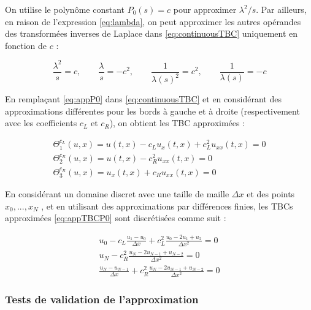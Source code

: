 \indent On utilise le polynôme constant $P_0(s) = c$  pour approximer $\lambda^2/s$. Par ailleurs, en raison de l'expression \eqref{eq:lambda}, on peut approximer les autres opérandes des transformées inverses de Laplace dans \eqref{eq:continuousTBC} uniquement en fonction de $c$ :

\begin{equation}
	\label{eq:appP0}
	\frac{\lambda^2}{s}  = c, \qquad
	\frac{\lambda}{s}  = -c^2, \qquad
	\frac{1}{\lambda(s)^2}  = c^2,\qquad 
	 \frac{1}{\lambda(s)}  = -c 
\end{equation}

\indent En remplaçant \eqref{eq:appP0}  dans \eqref{eq:continuousTBC} et en considérant des approximations différentes pour les bords à gauche et à droite (respectivement avec les coefficients $c_L$ et $c_R$), on obtient les TBC approximées :

\begin{equation}
\label{eq:appTBCP0}
    \begin{gathered}
        \Theta_1^{c_L}(u,x) = u(t,x) - c_L u_x(t,x)  + c_L^2  u_{xx}(t,x) = 0 \\
        \Theta_2^{c_R}(u,x) = u(t,x) - c_R^2  u_{xx}(t,x) = 0 \\
        \Theta_3^{c_R}(u,x) = u_x(t,x) + c_R u_{xx}(t,x)= 0 
    \end{gathered}
\end{equation}

\indent En considérant un domaine discret avec une taille de maille $\Delta x$ et des points $x_0, ..., x_N$ , et en utilisant des approximations par différences finies, les TBCs approximées \eqref{eq:appTBCP0} sont discrétisées comme suit :

\begin{equation*}
    \begin{gathered}
        u_0 - c_L \frac{u_1 - u_0}{\Delta x}  + c_L^2  \frac{u_0 -2u_1 + u_2}{\Delta x^2} = 0 \\
        u_N - c_R^2    \frac{u_N -2u_{N-1} + u_{N-2}}{\Delta x^2} = 0 \\
        \frac{u_N - u_{N-1}}{\Delta x}  + c_R^2    \frac{u_N -2u_{N-1} + u_{N-2}}{\Delta x^2} = 0 
    \end{gathered}
\end{equation*}

\subsubsection{Tests de validation de l'approximation}

